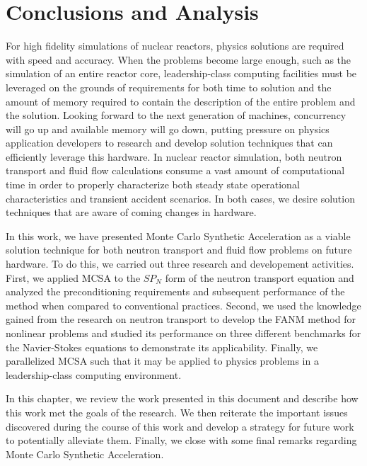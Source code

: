 \chapter{Conclusions and Analysis\ }
\label{ch:conclusion}

For high fidelity simulations of nuclear reactors, physics solutions
are required with speed and accuracy. When the problems become large
enough, such as the simulation of an entire reactor core,
leadership-class computing facilities must be leveraged on the grounds
of requirements for both time to solution and the amount of memory
required to contain the description of the entire problem and the
solution. Looking forward to the next generation of machines,
concurrency will go up and available memory will go down, putting
pressure on physics application developers to research and develop
solution techniques that can efficiently leverage this hardware. In
nuclear reactor simulation, both neutron transport and fluid flow
calculations consume a vast amount of computational time in order to
properly characterize both steady state operational characteristics
and transient accident scenarios. In both cases, we desire solution
techniques that are aware of coming changes in hardware.

In this work, we have presented Monte Carlo Synthetic Acceleration as
a viable solution technique for both neutron transport and fluid flow
problems on future hardware. To do this, we carried out three research
and developement activities. First, we applied MCSA to the $SP_N$ form
of the neutron transport equation and analyzed the preconditioning
requirements and subsequent performance of the method when compared to
conventional practices. Second, we used the knowledge gained from the
research on neutron transport to develop the FANM method for nonlinear
problems and studied its performance on three different benchmarks for
the Navier-Stokes equations to demonstrate its applicability. Finally,
we parallelized MCSA such that it may be applied to physics problems
in a leadership-class computing environment.

In this chapter, we review the work presented in this document and
describe how this work met the goals of the research. We then
reiterate the important issues discovered during the course of this
work and develop a strategy for future work to potentially alleviate
them. Finally, we close with some final remarks regarding Monte Carlo
Synthetic Acceleration.

